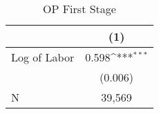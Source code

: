 \begin{table}[htbp]\centering
\def\sym#1{\ifmmode^{#1}\else\(^{#1}\)\fi}
\caption{OP First Stage \label{tab:q5a}}
\begin{tabular}{l*{1}{c}}
\toprule
                    &\multicolumn{1}{c}{(1)}         \\
\midrule
Log of Labor        &       0.598\sym{***}\\
                    &     (0.006)         \\
\midrule
N                   &      39,569         \\
\bottomrule
\end{tabular}
\end{table}

